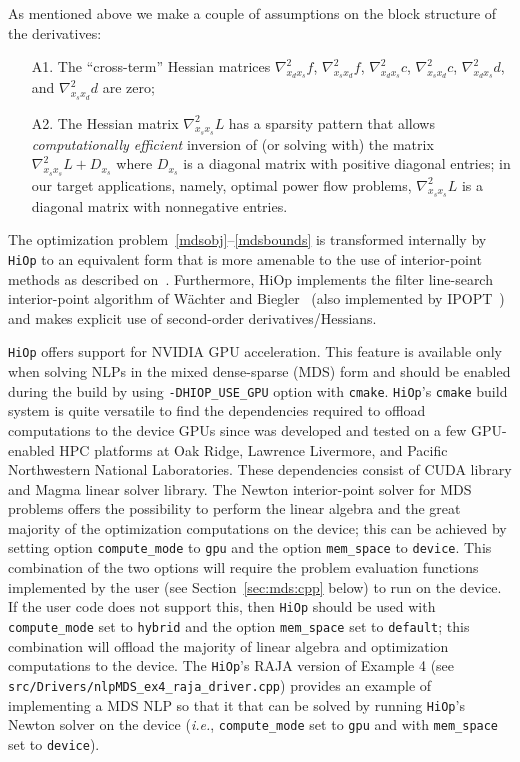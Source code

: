 \documentclass[11pt]{article}
\newcounter{line}
\newcommand{\Hi}{\texttt{HiOp}\xspace}
\begin{document}
As mentioned above we make a couple of assumptions on the block structure of the derivatives:
\begin{itemize}
    \item[A1.] The ``cross-term'' Hessian matrices $\nabla^2_{x_d x_s} f$, $\nabla^2_{x_s x_d} f$, $\nabla^2_{x_d x_s} c$, $\nabla^2_{x_s x_d} c$, $\nabla^2_{x_d x_s} d$, and $\nabla^2_{x_s x_d} d$ are zero;
    \item[A2.] The Hessian matrix $\nabla^2_{x_s x_s} L$ has a sparsity pattern that allows \textit{computationally efficient} inversion of (or solving with) the matrix $\nabla^2_{x_s x_s} L + D_{x_s}$ where $D_{x_s}$ is a diagonal matrix with positive diagonal entries; in our target applications, namely, optimal power flow problems, $\nabla^2_{x_s x_s} L$ is a diagonal matrix with nonnegative entries.
\end{itemize}

The optimization problem~\eqref{mdsobj}--\eqref{mdsbounds} is transformed internally by \Hi to an equivalent form that is more amenable to the use of interior-point methods as described on~\cite[Section~3]{petra2019memory}. Furthermore, HiOp implements the filter line-search interior-point algorithm of W{\"a}chter and Biegler~\cite{waecther_05_ipopt,waecther_05_ipopt2} (also implemented by IPOPT~\cite{waecther_05_ipopt0}) and makes explicit use of second-order derivatives/Hessians.

\Hi offers support for NVIDIA GPU acceleration. This feature is available only when solving NLPs in the mixed dense-sparse (MDS) form and should be enabled during the build by using \texttt{-DHIOP\_USE\_GPU} option with \texttt{cmake}. \Hi's \texttt{cmake} build system is quite versatile to find the dependencies required to offload computations to the device GPUs since was developed and tested on a few GPU-enabled HPC platforms at Oak Ridge, Lawrence Livermore, and Pacific Northwestern National Laboratories. These dependencies consist of CUDA library and Magma linear solver library.
The Newton interior-point solver for MDS problems offers the possibility to perform the linear algebra and the great majority of the optimization computations on the device; this can be achieved by setting option \texttt{compute\_mode} to \texttt{gpu} and the option \texttt{mem\_space} to \texttt{device}. This combination of the two options will require the problem evaluation functions implemented by the user (see Section~\ref{sec:mds:cpp} below) to run on the device. If the user code does not support this, then \Hi should be used with \texttt{compute\_mode} set to \texttt{hybrid} and the option \texttt{mem\_space} set to \texttt{default}; this combination will offload the majority of linear algebra and optimization computations to the device. The \Hi's RAJA version of Example 4 (see \texttt{src/Drivers/nlpMDS\_ex4\_raja\_driver.cpp}) provides an example of implementing a MDS NLP so that it that can be solved by running \Hi's Newton solver on the device (\textit{i.e.}, \texttt{compute\_mode} set to \texttt{gpu} and with \texttt{mem\_space} set to \texttt{device}).
\end{document}
